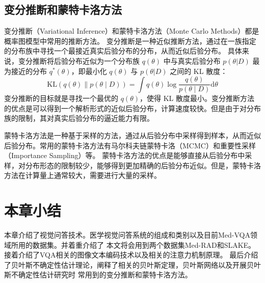 \subsection{变分推断和蒙特卡洛方法}
变分推断（Variational Inference）和蒙特卡洛方法（Monte Carlo Methods）都是概率图模型中常用的推断方法。
变分推断是一种近似推断方法\cite{jordan1999introduction}，通过在一族指定的分布族中寻找一个最接近真实后验分布的分布，从而近似后验分布。
具体来说，变分推断将后验分布近似为一个分布族 $q(\theta)$ 中与真实后验分布 $p(\theta|D)$ 最为接近的分布 $q^*(\theta)$，即最小化 $q(\theta)$ 与 $p(\theta|D)$ 之间的 KL 散度：
\begin{equation}
	\label{mtkl}
	\mathrm{KL}(q(\theta) \| p(\theta \mid D))=\int q(\theta) \log \frac{q(\theta)}{p(\theta \mid D)} \mathrm{d} \theta
\end{equation}
变分推断的目标就是寻找一个最优的 $q(\theta)$，使得 KL 散度最小。变分推断方法的优点是可以得到一个解析形式的近似后验分布，计算速度较快。但是由于对分布族的限制，其对真实后验分布的逼近能力有限。

蒙特卡洛方法\cite{metropolis1953equation}是一种基于采样的方法，通过从后验分布中采样得到样本，从而近似后验分布。常用的蒙特卡洛方法有马尔科夫链蒙特卡洛（MCMC）和重要性采样（Importance Sampling）等。
蒙特卡洛方法的优点是能够直接从后验分布中采样，对分布形态的限制较少，能够得到更加精确的后验分布近似。但是，蒙特卡洛方法在计算量上通常较大，需要进行大量的采样。

\section{本章小结}
本章介绍了视觉问答技术。医学视觉问答系统的组成和类别以及目前Med-VQA领域所用的数据集。并着重介绍了
本文将会用到两个数据集Med-RAD和SLAKE。接着介绍了VQA相关的图像文本编码技术以及相关的注意力机制原理。
最后介绍了贝叶斯不确定性估计理论，阐释了相关的贝叶斯定理，贝叶斯网络以及开展贝叶斯不确定性估计研究时
常用到的变分推断和蒙特卡洛方法。


